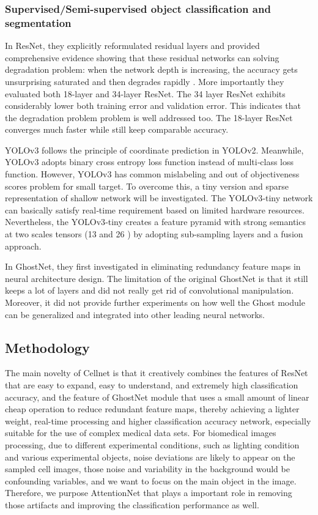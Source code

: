 \subsubsection{Supervised/Semi-supervised object classification and segmentation}
In ResNet\cite{b20}, they explicitly reformulated residual layers and provided comprehensive evidence showing that these residual networks can solving degradation problem: when the network depth is increasing, the accuracy gets unsurprising saturated and then degrades rapidly \cite{b20}.
More importantly they evaluated both 18-layer and 34-layer ResNet. The 34 layer ResNet exhibits considerably lower both training error and validation error. This indicates that the degradation problem problem is well addressed too. The 18-layer ResNet\cite{b20} converges much faster while still keep comparable accuracy. 

YOLOv3 \cite{b33} follows the principle of coordinate prediction in YOLOv2. 
Meanwhile, YOLOv3 adopts binary cross entropy loss function instead of multi‐class loss function\cite{b18}. However, YOLOv3 has common mislabeling and out of objectiveness scores problem for small target. To overcome this, a tiny version and sparse representation of shallow network will be investigated. The YOLOv3‐tiny network can basically satisfy real‐time requirement based on limited hardware resources. Nevertheless, the YOLOv3‐tiny creates a feature pyramid with strong semantics at two scales tensors (13  and 26 ) by adopting sub-sampling layers and a fusion approach\cite{b18}.

In GhostNet\cite{b19}, they first investigated in eliminating redundancy feature maps in neural architecture design. The limitation of the original GhostNet \cite{b19} is that it still keeps a lot of layers and did not really get rid of convolutional manipulation. Moreover, it did not provide further experiments on how well the Ghost module can be generalized and integrated into other leading neural networks.

\subsection{Methodology}
The main novelty of Cellnet is that it creatively combines the features of ResNet\cite{b20} that are easy to expand, easy to understand, and extremely high classification accuracy, and the feature of GhostNet\cite{b19} module that uses a small amount of linear cheap operation to reduce  redundant feature maps, thereby achieving a lighter weight, real-time processing and higher classification accuracy network, especially suitable for the use of complex medical data sets.
For biomedical images processing, due to different experimental conditions, such as lighting condition and various  experimental objects, noise deviations are likely to appear on the sampled cell images\cite{b6}\cite{b7}, those noise and variability in the background would be confounding variables, and we want to focus on the main object in the image. Therefore, we purpose AttentionNet that plays a important role in removing those artifacts and improving the  classification performance as well.

